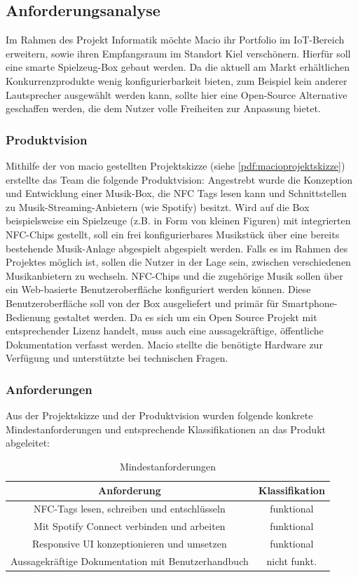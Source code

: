 \documentclass[10pt, a4paper]{article}
\begin{document}
\begin{onehalfspace}
\subsection{Anforderungsanalyse}
Im Rahmen des Projekt Informatik möchte Macio ihr Portfolio im IoT-Bereich erweitern, sowie ihren Empfangsraum im Standort Kiel verschönern.
Hierfür soll eine smarte Spielzeug-Box gebaut werden.
Da die aktuell am Markt erhältlichen Konkurrenzprodukte wenig konfigurierbarkeit bieten, zum Beispiel kein anderer Lautsprecher ausgewählt werden kann, sollte hier eine Open-Source Alternative geschaffen werden, die dem Nutzer volle Freiheiten zur Anpassung bietet.
\subsubsection{Produktvision}
Mithilfe der von macio gestellten Projektskizze (siehe \ref{pdf:macioprojektskizze}) erstellte das Team die folgende Produktvision:
Angestrebt wurde die Konzeption und Entwicklung einer Musik-Box, die NFC Tags lesen kann und Schnittstellen zu Musik-Streaming-Anbietern (wie Spotify) besitzt.
Wird auf die Box beispielsweise ein Spielzeuge (z.B. in Form von kleinen Figuren) mit integrierten NFC-Chips gestellt, soll ein frei konfigurierbares Musikstück über eine bereits bestehende Musik-Anlage abgespielt abgespielt werden.
Falls es im Rahmen des Projektes möglich ist, sollen die Nutzer in der Lage sein, zwischen verschiedenen Musikanbietern zu wechseln.
NFC-Chips und die zugehörige Musik sollen über ein Web-basierte Benutzeroberfläche konfiguriert werden können.
Diese Benutzeroberfläche soll von der Box ausgeliefert und primär für Smartphone-Bedienung gestaltet werden.
Da es sich um ein Open Source Projekt mit entsprechender Lizenz handelt, muss auch eine aussagekräftige, öffentliche Dokumentation verfasst werden.
Macio stellte die benötigte Hardware zur Verfügung und unterstützte bei technischen Fragen.\\

\subsubsection{Anforderungen}
Aus der Projektskizze und der Produktvision wurden folgende konkrete Mindestanforderungen und entsprechende Klassifikationen an das Produkt abgeleitet:
\begin{center}
  \begin{table}[h!]
    \begin{tabular}{c|c}
      Anforderung & Klassifikation\\
      \hline
      NFC-Tags lesen, schreiben und entschlüsseln & funktional  \\
      Mit Spotify Connect verbinden und arbeiten & funktional \\
      Responsive UI konzeptionieren und umsetzen & funktional  \\
      Aussagekräftige Dokumentation mit Benutzerhandbuch & nicht funkt.  \\
    \end{tabular}
    \caption{\label{mind-anforderungen}Mindestanforderungen}
\end{table}
\end{center}


\end{onehalfspace}
\end{document}
